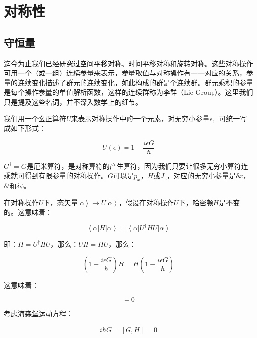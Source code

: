 \section{对称性}

\subsection{守恒量}

迄今为止我们已经研究过空间平移对称、时间平移对称和旋转对称。这些对称操作可用一个（或一组）连续参量来表示，参量取值与对称操作有一一对应的关系，参量的连续变化描述了群元的连续变化，如此构成的群是个连续群。群元乘积的参量是每个操作参量的单值解析函数，这样的连续群称为李群（Lie Group）。这里我们只是提及这些名词，并不深入数学上的细节。

我们用一个幺正算符$U$来表示对称操作中的一个元素，对无穷小参量$\epsilon$，可统一写成如下形式：

\begin{equation}
U(\epsilon) = 1 - \frac{i \epsilon G}{\hbar}
\end{equation}

$G^\dagger = G$是厄米算符，是对称算符的产生算符，因为我们只要让很多无穷小算符连乘就可得到有限参量的对称操作。$G$可以是$p_x$，$H$或$J_z$，对应的无穷小参量是$\delta x$，$\delta t$和$\delta \phi$。

在对称操作$U$下，态矢量$\left| \alpha \right\rangle \to U \left| \alpha \right\rangle $，假设在对称操作$U$下，哈密顿$H$是不变的。这意味着：

\begin{equation}
\left\langle \alpha \right| H \left| \alpha \right\rangle = \left\langle \alpha \right| U^\dagger H U \left| \alpha \right\rangle 
\end{equation}

即：$H = U^\dagger H U$，那么：$U H = H U $，那么：

\begin{equation*}
\left( 1 - \frac{i \epsilon G}{\hbar} \right) H = H \left( 1 - \frac{i \epsilon G}{\hbar} \right)
\end{equation*}

这意味着：

\begin{equation}
[G, H ] = 0
\end{equation}

考虑海森堡运动方程：

\begin{equation}
i \hbar \dot G = [G, H ] = 0
\end{equation}

